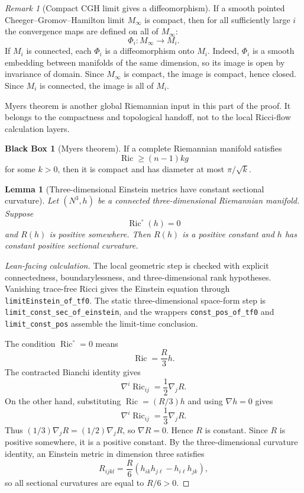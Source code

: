 \documentclass[11pt]{article}
\theoremstyle{plain}
\newtheorem{lemma}[theorem]{Lemma}
\theoremstyle{definition}
\newtheorem{blackbox}[theorem]{Black Box}
\theoremstyle{remark}
\newtheorem{remark}[theorem]{Remark}
\newcommand{\Ric}{\operatorname{Ric}}
\newcommand{\leanref}[1]{\nolinkurl{#1}}
\begin{document}
\begin{remark}[Compact CGH limit gives a diffeomorphism]
\label{rem:compact-cgh-limit-diffeomorphism}
If a smooth pointed Cheeger--Gromov--Hamilton limit $M_\infty$ is compact,
then for all sufficiently large $i$ the convergence maps are defined on all of
$M_\infty$:
\[
\Phi_i:M_\infty\to M_i.
\]
If $M_i$ is connected, each $\Phi_i$ is a diffeomorphism onto $M_i$. Indeed,
$\Phi_i$ is a smooth embedding between manifolds of the same dimension, so its
image is open by invariance of domain.  Since $M_\infty$ is compact, the image
is compact, hence closed.  Since $M_i$ is connected, the image is all of $M_i$.
\end{remark}

Myers theorem is another global Riemannian input in this part of the proof.  It
belongs to the compactness and topological handoff, not to the local Ricci-flow
calculation layers.

\begin{blackbox}[Myers theorem]
\label{bb:myers}
If a complete Riemannian manifold satisfies
\[
\Ric\ge (n-1)kg
\]
for some $k>0$, then it is compact and has diameter at most $\pi/\sqrt{k}$.
\end{blackbox}

\begin{lemma}[Three-dimensional Einstein metrics have constant sectional curvature]
\label{lem:3d-einstein-space-form}
Let $(N^3,h)$ be a connected three-dimensional Riemannian manifold. Suppose
\[
\Ric^\circ(h)=0
\]
and $R(h)$ is positive somewhere. Then $R(h)$ is a positive constant and $h$
has constant positive sectional curvature.
\end{lemma}

\begin{proof}[Lean-facing calculation]
The local geometric step is checked with explicit connectedness,
boundarylessness, and three-dimensional rank hypotheses.  Vanishing trace-free
Ricci gives the Einstein equation through \leanref{limitEinstein_of_tf0}.  The
static three-dimensional space-form step is
\leanref{limit_const_sec_of_einstein}, and the wrappers
\leanref{const_pos_of_tf0} and \leanref{limit_const_pos} assemble the
limit-time conclusion.

The condition \(\Ric^\circ=0\) means
\[
\Ric=\frac R3h.
\]
The contracted Bianchi identity gives
\[
\nabla^i\Ric_{ij}=\frac12\nabla_jR.
\]
On the other hand, substituting \(\Ric=(R/3)h\) and using \(\nabla h=0\) gives
\[
\nabla^i\Ric_{ij}=\frac13\nabla_jR.
\]
Thus \((1/3)\nabla_jR=(1/2)\nabla_jR\), so \(\nabla R=0\).  Hence $R$ is
constant.  Since $R$ is positive somewhere, it is a positive constant.  By the
three-dimensional curvature identity, an Einstein metric in dimension three
satisfies
\[
R_{ijkl}
=
\frac R6
\left(h_{ik}h_{j\ell}-h_{i\ell}h_{jk}\right),
\]
so all sectional curvatures are equal to $R/6>0$.
\end{proof}
\end{document}
